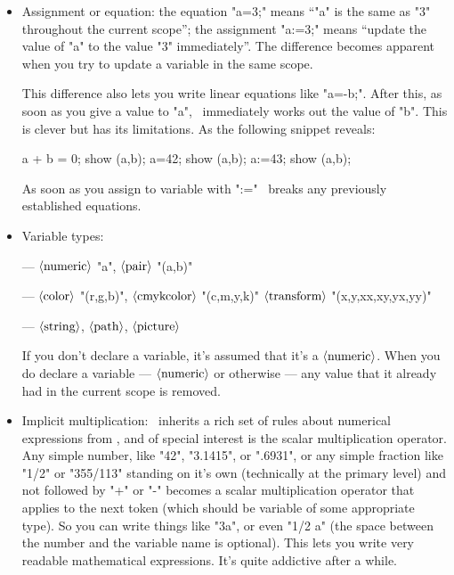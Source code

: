 \documentclass[a4paper,landscape]{article}
\def\mwpic#1#2{\vadjust{\moveright5.5in\vbox to 0pt{\hsize4in\vskip#1\centerline{\texttt{[image: \#2]}}\vss}}}
\def\<#1>{\ensuremath{\langle\hbox{#1}\rangle}}
\begin{document}
\begin{itemize}
    \item Assignment or equation:  the equation "a=3;" means “"a" is the same as "3" throughout the
        current scope”; the assignment "a:=3;" means “update the value of "a" to the value "3"
        immediately”.  The difference becomes apparent when you try to update a
        variable in the same scope.
        \mwpic{0pt}{tiling}

        This difference also lets you write linear equations
        like "a=-b;".  After this, as soon as you give  a value to "a", \MP\ immediately works
        out the value of "b".
        This is clever but has its limitations.  As the following snippet reveals:
\begin{code}
  a + b = 0; show (a,b);  %
  a=42;      show (a,b);  %
  a:=43;     show (a,b);  %
\end{code}
        As soon as you assign to variable with ":=" \MP\ breaks any previously
        established equations.

    \item Variable types:

        —
        \<numeric> "a",
        \<pair> "(a,b)"

        —
        \<color> "(r,g,b)",
        \<cmykcolor> "(c,m,y,k)"
        \<transform> "(x,y,xx,xy,yx,yy)"

        —
        \<string>,
        \<path>,
        \<picture>


        If you don’t declare a variable, it’s assumed that it’s a \<numeric>.
        When you do declare a variable --- \<numeric> or otherwise — any value that it
       already had in the current scope is removed.

    \item Implicit multiplication: \MP\ inherits a rich set of rules about numerical
        expressions from \MF, and of special interest is the scalar multiplication
        operator.  Any simple number, like "42", "3.1415", or ".6931", or any simple
        fraction like "1/2" or "355/113" standing on it’s own (technically at the
        primary level) and not followed by "+" or "-" becomes a scalar
        multiplication operator that applies to the next token (which should be variable
        of some appropriate type).
        So you can write things like "3a", or even "1/2 a"
        (the space between the number and the variable name is optional). This
        lets you write very readable mathematical expressions. It’s quite
        addictive after a while.

\end{itemize}
\end{document}
